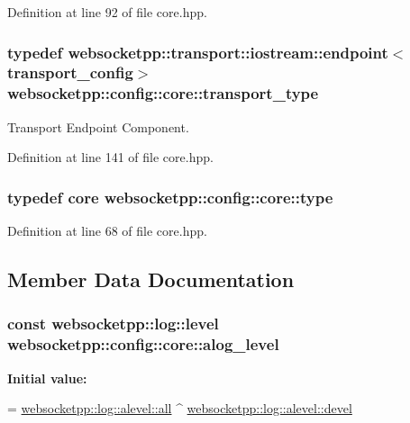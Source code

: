 Definition at line 92 of file core.\+hpp.

\hypertarget{structwebsocketpp_1_1config_1_1core_a378afa38a0e66a4d9a1a865ad1b2d13d}{}
\subsubsection[{transport\+\_\+type}]{\setlength{\rightskip}{0pt plus 5cm}typedef {\bf websocketpp\+::transport\+::iostream\+::endpoint}$<${\bf transport\+\_\+config}$>$ {\bf websocketpp\+::config\+::core\+::transport\+\_\+type}}\label{structwebsocketpp_1_1config_1_1core_a378afa38a0e66a4d9a1a865ad1b2d13d}


Transport Endpoint Component. 



Definition at line 141 of file core.\+hpp.

\hypertarget{structwebsocketpp_1_1config_1_1core_a889847e774c23625d729b6668d4d0ec8}{}
\subsubsection[{type}]{\setlength{\rightskip}{0pt plus 5cm}typedef {\bf core} {\bf websocketpp\+::config\+::core\+::type}}\label{structwebsocketpp_1_1config_1_1core_a889847e774c23625d729b6668d4d0ec8}


Definition at line 68 of file core.\+hpp.



\subsection{Member Data Documentation}
\hypertarget{structwebsocketpp_1_1config_1_1core_abcefa380ef3c250f919ae6a44a9b5724}{}
\subsubsection[{alog\+\_\+level}]{\setlength{\rightskip}{0pt plus 5cm}const {\bf websocketpp\+::log\+::level} websocketpp\+::config\+::core\+::alog\+\_\+level\hspace{0.3cm}{\ttfamily [static]}}\label{structwebsocketpp_1_1config_1_1core_abcefa380ef3c250f919ae6a44a9b5724}
{\bfseries Initial value\+:}
\begin{DoxyCode}
=
        \hyperlink{structwebsocketpp_1_1log_1_1alevel_a853aa0b8976e53f3181af3bc398d493e}{websocketpp::log::alevel::all} ^ 
      \hyperlink{structwebsocketpp_1_1log_1_1alevel_a65ec21c75999c993c25c72569018f576}{websocketpp::log::alevel::devel}
\end{DoxyCode}


